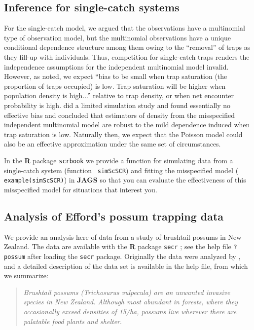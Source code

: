\subsection{Inference for single-catch systems}

For the single-catch model, we argued that the observations
have a multinomial type of observation model, but the
multinomial observations have a unique conditional dependence
structure among them owing to the ``removal'' of traps as they fill-up
with individuals.
Thus,
competition for single-catch traps renders the independence
assumptions for the independent multinomial model invalid.  However, as
\citet{efford_etal:2009euring} noted, we expect ``bias to be small
when trap saturation (the proportion of traps occupied) is low.  Trap
saturation will be higher when population density is high...''
relative to trap density, or when net encounter probability is high.
\citet{efford_etal:2009euring} did a limited simulation study and found essentially no
effective bias and concluded that estimators of density from the
misspecified independent multinomial model are robust to the mild
dependence induced when trap saturation is low.  Naturally then, we
expect that the
Poisson model could also be an effective approximation under the same set
of circumstances.

In the {\bf R} package \mbox{\tt scrbook} we provide a function for
simulating data from a single-catch system (function \mbox{\tt
  simScSCR}) and fitting the misspecified model (\mbox{\tt
  example(simScSCR)}) in {\bf JAGS} so that you can
evaluate the effectiveness of this misspecified model for
situations that interest you.


\subsection{Analysis of Efford's possum trapping data}

We provide an analysis here of data from a study of brushtail possums
in New Zealand. The data are available with the {\bf R} package
\mbox{\tt secr} \citep{efford_etal:2009euring}; see the help file
\mbox{\tt ?possum} after loading the \mbox{\tt secr} package.
Originally the data were analyzed by \citet{efford_etal:2005}, and a
detailed description of the data set is available in the help file,
from which we summarize:

\begin{quote}
{\it Brushtail possums (Trichosurus vulpecula) are an unwanted invasive
species in New Zealand. Although most abundant in forests, where they
occasionally exceed densities of 15/ha, possums live wherever there
are palatable food plants and shelter}.
\end{quote}

